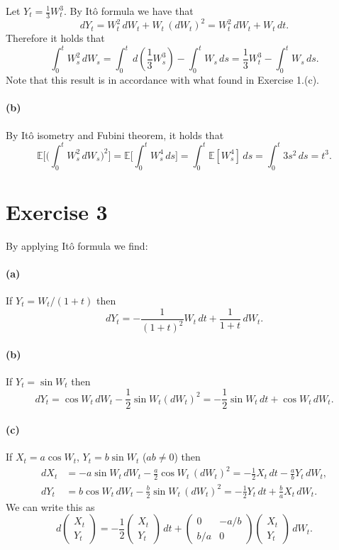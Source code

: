 \documentclass[a4paper,11pt]{article}
\theoremstyle{definition}
\theoremstyle{plain}
\theoremstyle{remark}
\begin{document}
Let $Y_t = \frac{1}{3}W_t^3$. By It\^o formula we have that
$$
dY_t = W_t^2\,dW_t + W_t\,(dW_t)^2 = W_t^2\,dW_t + W_t\,dt.
$$
Therefore it holds that
$$
\int_0^t W_s^2\,dW_s = \int_0^t\,d(\frac{1}{3}W_s^3) - \int_0^tW_s\,ds = \frac{1}{3}W_t^3 - \int_0^tW_s\,ds.
$$
Note that this result is in accordance with what found in Exercise 1.(c).

\paragraph*{(b)} 

By It\^o isometry and Fubini theorem, it holds that
$$
\mathbb{E}\Big[\Big(\int_0^t W_s^2\,dW_s\Big)^2\Big] = \mathbb{E}\Big[\int_0^tW_s^4\,ds\Big] = \int_0^t\mathbb{E}[W_s^4]\,ds = \int_0^t 3s^2\,ds = t^3. 
$$

\section*{Exercise 3}

By applying It\^o formula we find:

\paragraph*{(a)}

If $Y_t = W_t/(1+t)$ then
$$
dY_t = -\frac{1}{(1+t)^2}W_t\,dt + \frac{1}{1+t}\,dW_t.
$$

\paragraph*{(b)}

If $Y_t = \sin W_t$ then
$$
dY_t = \cos W_t\,dW_t-\frac{1}{2}\sin W_t (dW_t)^2 = -\frac{1}{2}\sin W_t\,dt + \cos W_t\,dW_t.
$$

\paragraph*{(c)}

If $X_t = a\cos W_t$, $Y_t = b\sin W_t$ ($ab\neq 0$) then
\begin{align*}
dX_t & = -a\sin W_t\,dW_t-\frac{a}{2}\cos W_t\,(dW_t)^2 = -\frac{1}{2}X_t\,dt -\frac{a}{b}Y_t\,dW_t, \\
dY_t & = b\cos W_t\,dW_t -\frac{b}{2}\sin W_t\,(dW_t)^2 = -\frac{1}{2}Y_t\,dt + \frac{b}{a}X_t\,dW_t. 
\end{align*}
We can write this as
$$
d\left(\begin{matrix}
X_t \\ Y_t
\end{matrix}\right) = -\frac{1}{2}\left(\begin{matrix}
X_t \\ Y_t
\end{matrix}\right)\,dt + \left(\begin{matrix}
0 & -a/b \\ b/a & 0
\end{matrix}\right)\left(\begin{matrix}
X_t \\ Y_t
\end{matrix}\right)\,dW_t.
$$
\end{document}
